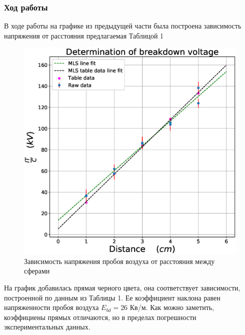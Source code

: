 \documentclass[a4paper,14pt]{extarticle}
\begin{document}
			\subsubsection{Ход работы}
				В ходе работы на графике из предыдущей части была построена зависимость напряжения от расстояния предлагаемая Таблицой 1
				\begin{figure}[h!]
					\centering
					\includegraphics[width=.80\linewidth]{Lab1_6.eps}
					\caption{Зависимость напряжения пробоя воздуха от расстояния между сферами}
					\label{fig10}
				\end{figure}
				\newline
				На график добавилась прямая черного цвета, она соответствует зависимости, построенной по данным из Таблицы 1. Ее коэффициент наклона равен напряженности пробоя воздуха $E_{bd} = 26$ Кв/м. Как можно заметить, коэффициены прямых отличаются, но в пределах погрешности экспериментальных данных.
\end{document}
